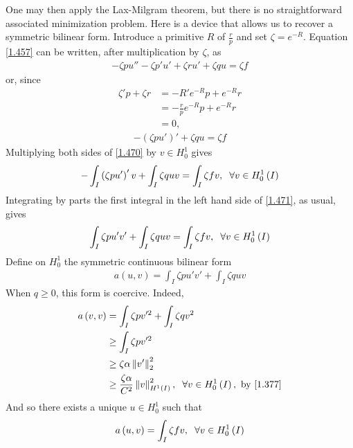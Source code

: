 \documentclass[a4paper,oneside]{book}
\numberwithin{equation}{chapter}
\begin{document}
One may then apply the Lax-Milgram theorem, but there is no straightforward associated minimization problem. Here is a device that allows us to recover a symmetric bilinear form. Introduce a primitive $R$ of $\frac{r}{p}$ and set $\zeta  = {e^{ - R}}$. Equation \eqref{1.457} can be written, after multiplication by $\zeta$, as
\begin{align}
 - \zeta pu'' - \zeta p'u' + \zeta ru' + \zeta qu = \zeta f
\end{align}
or, since
\begin{align}
\zeta 'p + \zeta r &=  - R'{e^{ - R}}p + {e^{ - R}}r\\
 &=  - \frac{r}{p}{e^{ - R}}p + {e^{ - R}}r\\
& = 0,
\end{align}
\begin{align}
\label{1.470}
- \left( {\zeta pu'} \right)' + \zeta qu = \zeta f
\end{align}
Multiplying both sides of \eqref{1.470} by $v\in H_0^1$ gives
\begin{align}
\label{1.471}
 - \int_I {\left( {\zeta pu'} \right)'v}  + \int_I {\zeta quv}  = \int_I {\zeta fv} ,\hspace{0.2cm}\forall v \in H_0^1\left( I \right)
\end{align}
Integrating by parts the first integral in the left hand side of \eqref{1.471}, as usual, gives
\begin{align}
\int_I {\zeta pu'v'}  + \int_I {\zeta quv}  = \int_I {\zeta fv} ,\hspace{0.2cm}\forall v \in H_0^1\left( I \right)
\end{align}
Define on $H_0^1$ the symmetric continuous bilinear form
\begin{align}
a\left( {u,v} \right) = \int_I {\zeta pu'v'}  + \int_I {\zeta quv} 
\end{align}
When $q\ge 0$, this form is coercive. Indeed,
\begin{align}
a\left( {v,v} \right) &= \int_I {\zeta pv{'^2}}  + \int_I {\zeta q{v^2}} \\
& \ge \int_I {\zeta pv{'^2}} \\
& \ge \zeta \alpha \left\| {v'} \right\|_2^2\\
& \ge \frac{{\zeta \alpha }}{{{C^2}}}\left\| v \right\|_{{H^1}\left( I \right)}^2,\hspace{0.2cm}\forall v \in H_0^1\left( I \right),\mbox{ by \eqref{1.377}}
\end{align}
And so there exists a unique $u\in H_0^1$ such that
\begin{align}
a\left( {u,v} \right) = \int_I {\zeta fv} ,\hspace{0.2cm}\forall v \in H_0^1\left( I \right)
\end{align}
\end{document}
